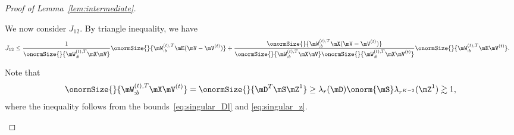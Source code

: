 \documentclass[lettersize,onecolumn,journal]{IEEEtran}
\theoremstyle{definition}
\theoremstyle{definition}
\begin{document}
\begin{proof}[Proof of Lemma~\ref{lem:intermediate}]
\begin{enumerate}[wide]
{    
    We now consider $J_{12}$. By triangle inequality, we have 
    \begin{align}
        J_{12} &\leq \frac{ 1}{\onormSize{}{\mW_{:b}^{(t),T} \mX \mV }} \onormSize{}{\mW_{:b}^{(t),T} \mE (\mV-\mV^{(t)})}   +
        \frac{ \onormSize{}{\mW_{:b}^{(t),T} \mX (\mV-\mV^{(t)})} }{\onormSize{}{\mW_{:b}^{(t),T} \mX \mV }\onormSize{}{\mW_{:b}^{(t),T} \mX \mV^{(t)} }} \onormSize{}{\mW_{:b}^{(t),T} \mE \mV^{(t)} }.
    \end{align}

     Note that 
    \begin{equation}\label{eq:j11_wxvt}
       \onormSize{}{\mW_{:b}^{(t),T} \mX \mV^{(t)}} = \onormSize{}{\mD^T \mS \mZ^1} \geq \lambda_r(\mD) \onorm{\mS} \lambda_{r^{K-2}}(\mZ^1) \gtrsim 1,
    \end{equation}
    where the inequality follows from the bounds~\eqref{eq:singular_Dl} and \eqref{eq:singular_z}.

}
\end{enumerate}
\end{proof}
\end{document}
